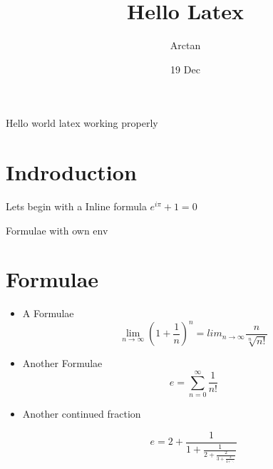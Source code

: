 \documentclass{article}
\title{Hello Latex}
\author{Arctan}
\date{19 Dec}
\begin{document}
    \maketitle
    Hello world  latex working properly
    \section{Indroduction}

    Lets begin with a Inline formula $e^{i\pi} + 1 =0$

Formulae with own env
    \section*{Formulae}
    \begin{itemize}  %
   \item A Formulae
     $$ \lim_{n\to\infty} \left(1+\frac{1}{n}\right)^n = lim_{n\to\infty}\frac{n}{\sqrt[n]{n!}} $$

   \item Another Formulae
     $$e = \sum_{n=0}^{\infty}\frac{1}{n!}$$
    
  \item  Another continued fraction

     $$e = 2+\frac{1}{1+\frac{1}{2+\frac{2}{3+\frac{3}{4+\ddots}}}}$$
\end{itemize}
\end{document}
